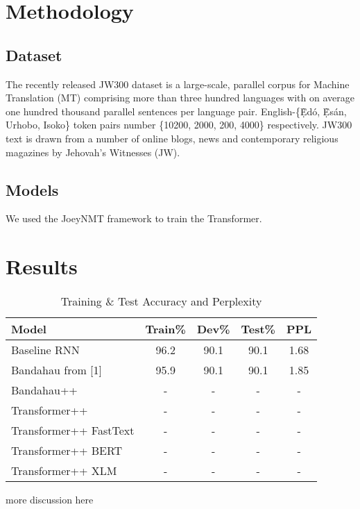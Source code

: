 \documentclass{article} %
\begin{document}
\section{Methodology}
\label{methods}

\subsection{Dataset}
The recently released JW300 dataset is a large-scale, parallel corpus for Machine Translation (MT) comprising more than three hundred languages with on average one hundred thousand parallel sentences per language pair. English-\{\d{\`E}d{\'o}, \d{\`E}s{\'a}n, Urhobo, Isoko\} token pairs number \{10200, 2000, 200, 4000\} respectively. JW300 text is drawn from a number of online blogs, news and contemporary religious magazines by Jehovah's Witnesses (JW).
\subsection{Models}

We used the JoeyNMT framework to train the Transformer. 

\section{Results}
\label{results}

 \begin{table}[h]
  \caption{Training \& Test Accuracy and Perplexity}
  \label{tab:results}
  \centering
  \begin{tabular}{lcccc}
    \toprule
    \textbf{Model} & \textbf{Train\%} & \textbf{Dev\%} & \textbf{Test\%} &\textbf{PPL} \\
    \midrule
    Baseline RNN & 96.2 & 90.1 & 90.1 & 1.68 \\
    Bandahau from [1] & 95.9 & 90.1 & 90.1 & 1.85 \\
    \midrule
	Bandahau++ & - & - & - & - \\ 
	Transformer++ & - & - & - & - \\ 
	\midrule
	Transformer++ FastText & - & - & - & - \\ 
	Transformer++ BERT & - & - & - & - \\ 
	Transformer++ XLM & - & - & - & - \\ 

    \bottomrule
  \end{tabular}
\end{table}

more discussion here
\end{document}
